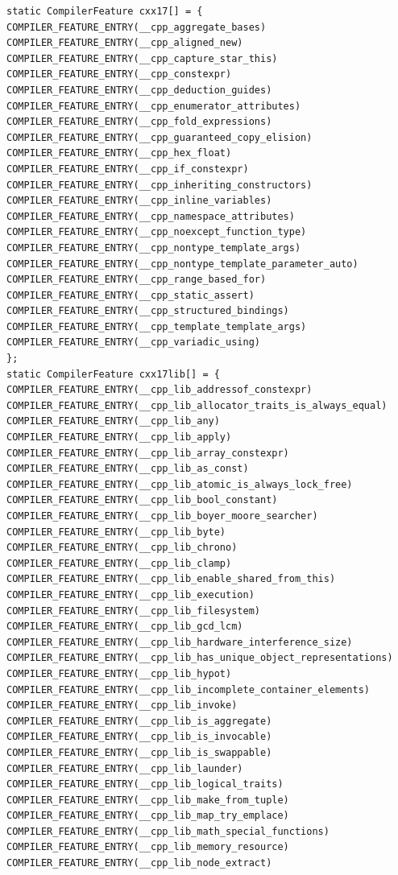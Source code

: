 \begin{lstlisting}[style=styleCXX]
static CompilerFeature cxx17[] = {
COMPILER_FEATURE_ENTRY(__cpp_aggregate_bases)
COMPILER_FEATURE_ENTRY(__cpp_aligned_new)
COMPILER_FEATURE_ENTRY(__cpp_capture_star_this)
COMPILER_FEATURE_ENTRY(__cpp_constexpr)
COMPILER_FEATURE_ENTRY(__cpp_deduction_guides)
COMPILER_FEATURE_ENTRY(__cpp_enumerator_attributes)
COMPILER_FEATURE_ENTRY(__cpp_fold_expressions)
COMPILER_FEATURE_ENTRY(__cpp_guaranteed_copy_elision)
COMPILER_FEATURE_ENTRY(__cpp_hex_float)
COMPILER_FEATURE_ENTRY(__cpp_if_constexpr)
COMPILER_FEATURE_ENTRY(__cpp_inheriting_constructors)
COMPILER_FEATURE_ENTRY(__cpp_inline_variables)
COMPILER_FEATURE_ENTRY(__cpp_namespace_attributes)
COMPILER_FEATURE_ENTRY(__cpp_noexcept_function_type)
COMPILER_FEATURE_ENTRY(__cpp_nontype_template_args)
COMPILER_FEATURE_ENTRY(__cpp_nontype_template_parameter_auto)
COMPILER_FEATURE_ENTRY(__cpp_range_based_for)
COMPILER_FEATURE_ENTRY(__cpp_static_assert)
COMPILER_FEATURE_ENTRY(__cpp_structured_bindings)
COMPILER_FEATURE_ENTRY(__cpp_template_template_args)
COMPILER_FEATURE_ENTRY(__cpp_variadic_using)
};
static CompilerFeature cxx17lib[] = {
COMPILER_FEATURE_ENTRY(__cpp_lib_addressof_constexpr)
COMPILER_FEATURE_ENTRY(__cpp_lib_allocator_traits_is_always_equal)
COMPILER_FEATURE_ENTRY(__cpp_lib_any)
COMPILER_FEATURE_ENTRY(__cpp_lib_apply)
COMPILER_FEATURE_ENTRY(__cpp_lib_array_constexpr)
COMPILER_FEATURE_ENTRY(__cpp_lib_as_const)
COMPILER_FEATURE_ENTRY(__cpp_lib_atomic_is_always_lock_free)
COMPILER_FEATURE_ENTRY(__cpp_lib_bool_constant)
COMPILER_FEATURE_ENTRY(__cpp_lib_boyer_moore_searcher)
COMPILER_FEATURE_ENTRY(__cpp_lib_byte)
COMPILER_FEATURE_ENTRY(__cpp_lib_chrono)
COMPILER_FEATURE_ENTRY(__cpp_lib_clamp)
COMPILER_FEATURE_ENTRY(__cpp_lib_enable_shared_from_this)
COMPILER_FEATURE_ENTRY(__cpp_lib_execution)
COMPILER_FEATURE_ENTRY(__cpp_lib_filesystem)
COMPILER_FEATURE_ENTRY(__cpp_lib_gcd_lcm)
COMPILER_FEATURE_ENTRY(__cpp_lib_hardware_interference_size)
COMPILER_FEATURE_ENTRY(__cpp_lib_has_unique_object_representations)
COMPILER_FEATURE_ENTRY(__cpp_lib_hypot)
COMPILER_FEATURE_ENTRY(__cpp_lib_incomplete_container_elements)
COMPILER_FEATURE_ENTRY(__cpp_lib_invoke)
COMPILER_FEATURE_ENTRY(__cpp_lib_is_aggregate)
COMPILER_FEATURE_ENTRY(__cpp_lib_is_invocable)
COMPILER_FEATURE_ENTRY(__cpp_lib_is_swappable)
COMPILER_FEATURE_ENTRY(__cpp_lib_launder)
COMPILER_FEATURE_ENTRY(__cpp_lib_logical_traits)
COMPILER_FEATURE_ENTRY(__cpp_lib_make_from_tuple)
COMPILER_FEATURE_ENTRY(__cpp_lib_map_try_emplace)
COMPILER_FEATURE_ENTRY(__cpp_lib_math_special_functions)
COMPILER_FEATURE_ENTRY(__cpp_lib_memory_resource)
COMPILER_FEATURE_ENTRY(__cpp_lib_node_extract)

\end{lstlisting}
